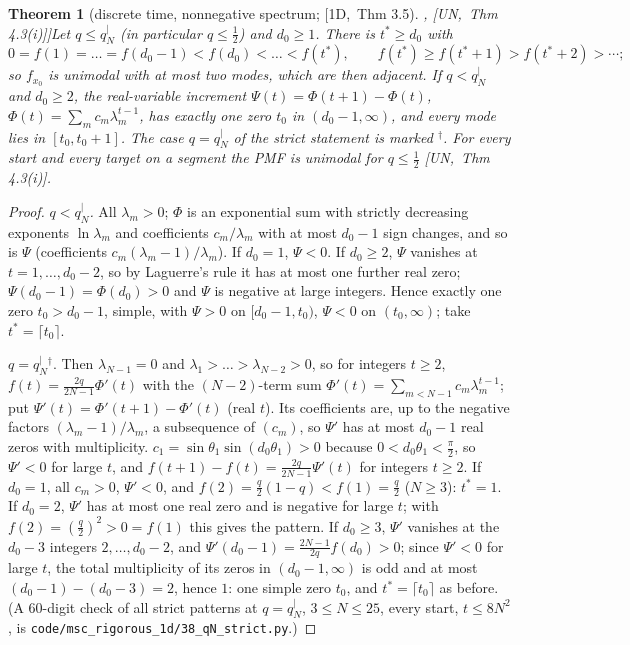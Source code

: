 \documentclass[10pt,a4paper]{article}
\theoremstyle{plain}
\newtheorem{theorem}{Theorem}[section]
\theoremstyle{definition}
\newcommand{\NEW}{\ensuremath{^{\dagger}}}       %
\newcommand{\src}[2]{[\textsf{#1},~#2]}           %
\newcommand{\ONE}{\textsf{1D}}
\newcommand{\UNI}{\textsf{UN}}
\newcommand{\qseg}{q^{|}_N}
\begin{document}
\begin{theorem}[discrete time, nonnegative spectrum; \src{\ONE}{Thm 3.5}, \src{\UNI}{Thm 4.3(i)}]\label{thm:1d-disc-unimodal}
Let $q\le\qseg$ (in particular $q\le\frac12$) and $d_0\ge1$. There is $t^*\ge d_0$ with
\[
0=f(1)=\dots=f(d_0-1)<f(d_0)<\dots<f(t^*),\qquad f(t^*)\ge f(t^*+1)>f(t^*+2)>\cdots ;
\]
so $f_{x_0}$ is unimodal with at most two modes, which are then adjacent. If $q<\qseg$ and $d_0\ge2$, the real-variable increment $\Psi(t)=\Phi(t+1)-\Phi(t)$, $\Phi(t)=\sum_mc_m\lambda_m^{t-1}$, has exactly one zero $t_0$ in $(d_0-1,\infty)$, and every mode lies in $[t_0,t_0+1]$. The case $q=\qseg$ of the strict statement is marked \NEW. For every start and every target on a segment the PMF is unimodal for $q\le\frac12$ \src{\UNI}{Thm 4.3(i)}.
\end{theorem}
\begin{proof}
\emph{$q<\qseg$.} All $\lambda_m>0$; $\Phi$ is an exponential sum with strictly decreasing exponents $\ln\lambda_m$ and coefficients $c_m/\lambda_m$ with at most $d_0-1$ sign changes, and so is $\Psi$ (coefficients $c_m(\lambda_m-1)/\lambda_m$). If $d_0=1$, $\Psi<0$. If $d_0\ge2$, $\Psi$ vanishes at $t=1,\dots,d_0-2$, so by Laguerre's rule it has at most one further real zero; $\Psi(d_0-1)=\Phi(d_0)>0$ and $\Psi$ is negative at large integers. Hence exactly one zero $t_0>d_0-1$, simple, with $\Psi>0$ on $[d_0-1,t_0)$, $\Psi<0$ on $(t_0,\infty)$; take $t^*=\lceil t_0\rceil$.

\emph{$q=\qseg$}\NEW. Then $\lambda_{N-1}=0$ and $\lambda_1>\dots>\lambda_{N-2}>0$, so for integers $t\ge2$, $f(t)=\frac{2q}{2N-1}\Phi'(t)$ with the $(N-2)$-term sum $\Phi'(t)=\sum_{m<N-1}c_m\lambda_m^{t-1}$; put $\Psi'(t)=\Phi'(t+1)-\Phi'(t)$ (real $t$). Its coefficients are, up to the negative factors $(\lambda_m-1)/\lambda_m$, a subsequence of $(c_m)$, so $\Psi'$ has at most $d_0-1$ real zeros with multiplicity. $c_1=\sin\theta_1\sin(d_0\theta_1)>0$ because $0<d_0\theta_1<\frac\pi2$, so $\Psi'<0$ for large $t$, and $f(t+1)-f(t)=\frac{2q}{2N-1}\Psi'(t)$ for integers $t\ge2$. If $d_0=1$, all $c_m>0$, $\Psi'<0$, and $f(2)=\frac q2(1-q)<f(1)=\frac q2$ ($N\ge3$): $t^*=1$. If $d_0=2$, $\Psi'$ has at most one real zero and is negative for large $t$; with $f(2)=(\frac q2)^2>0=f(1)$ this gives the pattern. If $d_0\ge3$, $\Psi'$ vanishes at the $d_0-3$ integers $2,\dots,d_0-2$, and $\Psi'(d_0-1)=\frac{2N-1}{2q}f(d_0)>0$; since $\Psi'<0$ for large $t$, the total multiplicity of its zeros in $(d_0-1,\infty)$ is odd and at most $(d_0-1)-(d_0-3)=2$, hence $1$: one simple zero $t_0$, and $t^*=\lceil t_0\rceil$ as before. (A 60-digit check of all strict patterns at $q=\qseg$, $3\le N\le25$, every start, $t\le8N^2$, is \texttt{code/msc\_rigorous\_1d/38\_qN\_strict.py}.)
\end{proof}
\end{document}
